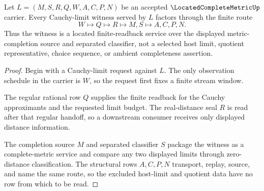\begin{theorem}\label{thm:located-complete-metric-cauchy-limit-witness}
Let $L=(M,S,R,Q,W,A,C,P,N)$ be an accepted $\LocatedCompleteMetricUp$ carrier. Every Cauchy-limit witness served by $L$ factors through the finite route
$$
W \longmapsto Q \longmapsto R \longmapsto M,S \longmapsto A,C,P,N .
$$
Thus the witness is a located finite-readback service over the displayed metric-completion source and separated classifier, not a selected host limit, quotient representative, choice sequence, or ambient completeness assertion.
\end{theorem}
\begin{proof}
Begin with a Cauchy-limit request against $L$. The only observation schedule in the carrier is $W$, so the request first fixes a finite stream window.

The regular rational row $Q$ supplies the finite readback for the Cauchy approximants and the requested limit budget. The real-distance seal $R$ is read after that regular handoff, so a downstream consumer receives only displayed distance information.

The completion source $M$ and separated classifier $S$ package the witness as a complete-metric service and compare any two displayed limits through zero-distance classification. The structural rows $A,C,P,N$ transport, replay, source, and name the same route, so the excluded host-limit and quotient data have no row from which to be read.
\end{proof}


\begin{closurestatus}{\LocatedCompleteMetricUp}
  \theoryclosure{\obligationClosure}
  \formalstatus{\unformalizedV}
\end{closurestatus}
